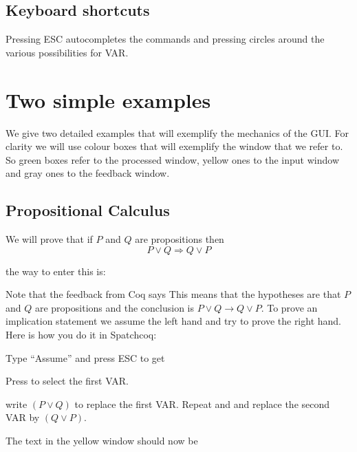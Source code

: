 \subsection{Keyboard shortcuts}

Pressing ESC autocompletes the commands and pressing \VAR circles around the various possibilities for VAR.

\section{Two simple examples}
We give two detailed examples that will exemplify the mechanics of the GUI. For clarity we will use colour boxes that will exemplify the window that we refer to. So green boxes refer to the processed window, yellow ones to the input window and gray ones to the feedback window.

\subsection{Propositional Calculus}

We will prove that if $P$ and $Q$ are propositions then $$P\lor Q \Rightarrow Q\lor P$$

the way to enter this is:

 
 Note that  the feedback from Coq says 
This means that the hypotheses are that $P$ and $Q$ are propositions and the conclusion is $ P \lor Q \rightarrow Q \lor P$. To prove an implication  statement we assume the left hand and try to prove the right hand. Here is how you do it in Spatchcoq:

Type ``Assume'' and press ESC to get 

\noindent
{}

Press \VAR to select the first VAR.

write $( P \lor Q )$ to replace the first VAR. Repeat \VAR and and replace the second VAR by $(Q \lor P)$.

The text in the yellow window should now be 

